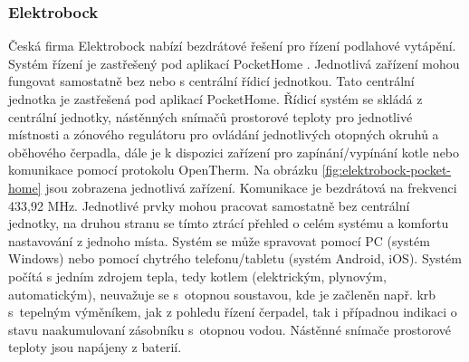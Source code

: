 \subsubsection{Elektrobock}
Česká firma Elektrobock \cite{elektrobock-stranky} nabízí bezdrátové řešení pro řízení podlahové vytápění. Systém řízení je zastřešený pod aplikací PocketHome \cite{pockethome-stranky}. Jednotlivá zařízení mohou fungovat samostatně bez nebo s centrální řídicí jednotkou. Tato centrální jednotka je zastřešená pod aplikací PocketHome. Řídicí systém se skládá z centrální jednotky, nástěnných snímačů prostorové teploty pro jednotlivé místnosti a zónového regulátoru pro ovládání jednotlivých otopných okruhů a oběhového čerpadla, dále je k dispozici zařízení pro zapínání/vypínání kotle nebo komunikace pomocí protokolu OpenTherm. Na obrázku \ref{fig:elektrobock-pocket-home} jsou zobrazena jednotlivá zařízení. Komunikace je bezdrátová na frekvenci 433,92 MHz. Jednotlivé prvky mohou pracovat samostatně bez centrální jednotky, na druhou stranu se tímto ztrácí přehled o celém systému a komfortu nastavování z jednoho místa. Systém se může spravovat pomocí PC (systém Windows) nebo pomocí chytrého telefonu/tabletu (systém Android, iOS). Systém počítá s jedním zdrojem tepla, tedy kotlem (elektrickým, plynovým, automatickým), neuvažuje se s~otopnou soustavou, kde je začleněn např. krb s~tepelným výměníkem, jak z pohledu řízení čerpadel, tak i případnou indikaci o stavu naakumulovaní zásobníku s~otopnou vodou. Nástěnné snímače prostorové teploty jsou napájeny z baterií.


